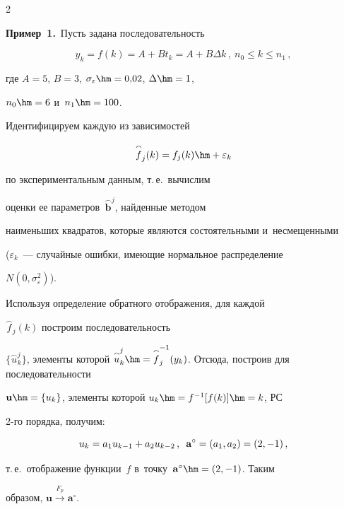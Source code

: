 \begin{multicols}{2}
{\begin{table}
\begin{center}
\end{center}

\end{table}}

  

  \textbf{Пример~1.}\ Пусть задана последовательность

  $$

  y_k=f(k)=A+Bt_k=A+B\Delta k\,,\ n_0\leq k\leq n_1\,,

  $$

где $A=5$, $B = 3$, $\sigma_\varepsilon\hm=0{,}02$, $\Delta\hm=1$, 

$n_0\hm=6$ и~$n_1\hm=100$.

  

  Идентифицируем каждую из зависимостей 

  $$

  \overset{\smallfrown}{f}_j(k)=  f_j(k)\hm+\varepsilon_k

$$ 

по экспериментальным данным, т.\,е.\ вычислим 

оценки ее параметров~$\overset{\smallfrown}{\mathbf{b}}^j$, найденные методом 

наименьших квадратов, которые являются состоятельными и~несмещенными 

($\varepsilon_k$~--- случайные ошибки, имеющие нормальное распределение 

$N(0,\sigma_\varepsilon^2)$).

  

  Используя определение обратного отображения, для каждой 

$\overset{\smallfrown}{f}_j(k)$ построим последовательность 

$\{\overset{\smallfrown}{u}_k^j\}$, элементы которой $\overset{\smallfrown}{u}_k^j \hm= 

\overset{\smallfrown}{f}_j^{-1}(y_k)$. Отсюда, построив для последовательности 

$\mathbf{u}\hm= \{u_k\}$, элементы которой $u_k\hm= f^{-1}[f(k)]\hm= k$, РС 

2-го порядка, получим:

  $$

  u_k=a_1 u_{k-1} +a_2 u_{k-2}\,,\enskip

  \mathbf{a}^\circ = \left(a_1,a_2\right)=(2,-1)\,,

  $$

т.\,е.\ отображение функции~$f$ в~точку~$\mathbf{a}^\circ\hm=(2,-1)$. Таким 

образом, $\mathbf{u}\overset{F_p}{\to} \mathbf{a}^\circ$.




\end{multicols}
